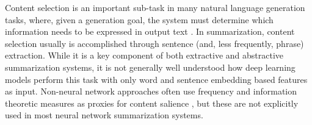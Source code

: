 Content selection is an important sub-task in many natural language generation
tasks,
where, given a generation goal, the system must determine which information
needs to be expressed in output text \cite{gatt2018survey}.
In summarization, content selection usually is accomplished through sentence (and,
less frequently, phrase) extraction.
 While it is a key component of both
extractive and abstractive summarization systems, it is not generally well 
understood how deep learning models perform this task with only word and 
sentence
embedding based features as input.
Non-neural network approaches often use frequency and information theoretic measures as proxies
for content salience \cite{hong2014improving}, but these are not explicitly %
used in most neural network summarization systems.


